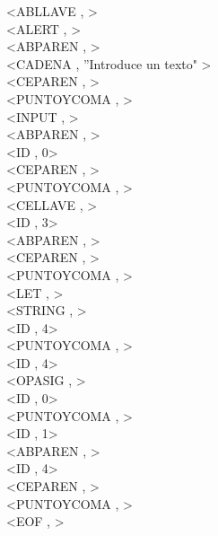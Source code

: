 \documentclass{article}
\begin{document}
\begin{flushleft}
<ABLLAVE , >\\
<ALERT , >\\
<ABPAREN , >\\
<CADENA , ''Introduce un texto" >\\
<CEPAREN , >\\
<PUNTOYCOMA , >\\
<INPUT , >\\
<ABPAREN , >\\
<ID , 0>\\
<CEPAREN , >\\
<PUNTOYCOMA , >\\
<CELLAVE , >\\
<ID , 3>\\
<ABPAREN , >\\
<CEPAREN , >\\
<PUNTOYCOMA , >\\
<LET , >\\
<STRING , >\\
<ID , 4>\\
<PUNTOYCOMA , >\\
<ID , 4>\\
<OPASIG , >\\
<ID , 0>\\
<PUNTOYCOMA , >\\
<ID , 1>\\
<ABPAREN , >\\
<ID , 4>\\
<CEPAREN , >\\
<PUNTOYCOMA , >\\
<EOF , >\\
\end{flushleft}
\clearpage
\end{document}

